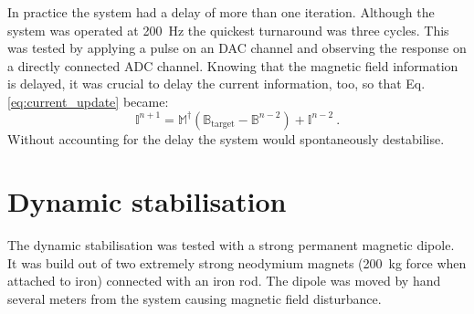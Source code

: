 In practice the system had a delay of more than one iteration. Although the system was operated at \SI{200}{\hertz} the quickest turnaround was three cycles. This was tested by applying a pulse on an DAC channel and observing the response on a directly connected ADC channel. Knowing that the magnetic field information is delayed, it was crucial to delay the current information, too, so that Eq.\,\ref{eq:current_update} became:
\begin{equation}
  \mathbb{I}^{n+1} = \mathbb{M}^\dagger \left( \mathbb{B}_\text{target} - \mathbb{B}^{n-2} \right) + \mathbb{I}^{n-2} \ .
\end{equation}
Without accounting for the delay the system would spontaneously destabilise.



\section{Dynamic stabilisation}
The dynamic stabilisation was tested with a strong permanent magnetic dipole. It was build out of two extremely strong neodymium magnets (\SI{200}{\kilo\gram} force when attached to iron) connected with an iron rod. The dipole was moved by hand several meters from the system causing magnetic field disturbance.


